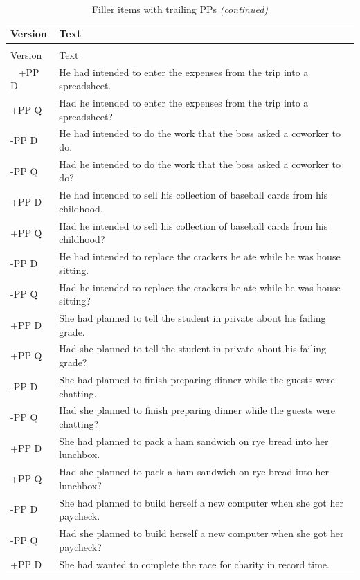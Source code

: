 \documentclass[12pt,oneside]{book}
\begin{document}
\begin{longtable}{ll}
\caption{\label{tab:unnamed-chunk-2}Filler items with trailing PPs}\\
\toprule
Version & Text\\
\midrule
\endfirsthead
\caption[]{\label{tab:unnamed-chunk-2}Filler items with trailing PPs \textit{(continued)}}\\
\toprule
Version & Text\\
\midrule
\endhead
\
\endfoot
\bottomrule
\endlastfoot
+PP D & He had intended to enter the expenses from the trip into a spreadsheet.\\
+PP Q & Had he intended to enter the expenses from the trip into a spreadsheet?\\
\addlinespace
-PP D & He had intended to do the work that the boss asked a coworker to do.\\
-PP Q & Had he intended to do the work that the boss asked a coworker to do?\\
\addlinespace
+PP D & He had intended to sell his collection of baseball cards from his childhood.\\
+PP Q & Had he intended to sell his collection of baseball cards from his childhood?\\
\addlinespace
-PP D & He had intended to replace the crackers he ate while he was house sitting.\\
-PP Q & Had he intended to replace the crackers he ate while he was house sitting?\\
\addlinespace
+PP D & She had planned to tell the student in private about his failing grade.\\
+PP Q & Had she planned to tell the student in private about his failing grade?\\
\addlinespace
-PP D & She had planned to finish preparing dinner while the guests were chatting.\\
-PP Q & Had she planned to finish preparing dinner while the guests were chatting?\\
\addlinespace
+PP D & She had planned to pack a ham sandwich on rye bread into her lunchbox.\\
+PP Q & Had she planned to pack a ham sandwich on rye bread into her lunchbox?\\
\addlinespace
-PP D & She had planned to build herself a new computer when she got her paycheck.\\
-PP Q & Had she planned to build herself a new computer when she got her paycheck?\\
\addlinespace
+PP D & She had wanted to complete the race for charity in record time.\\

\end{longtable}
\end{document}
